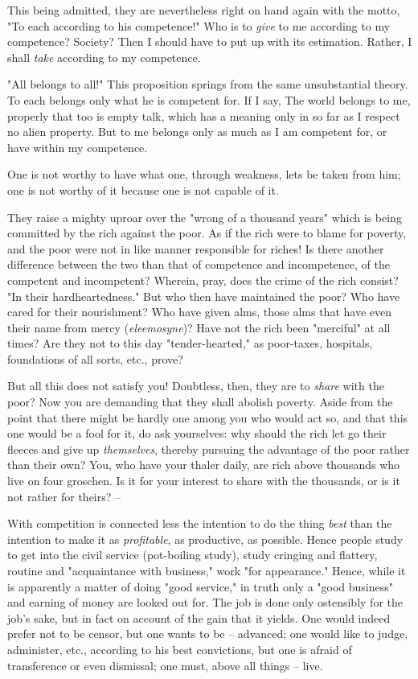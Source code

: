\documentclass[a4paper]{book}
\begin{document}
This being admitted, they are nevertheless right on hand again with the motto, 
"{}To each according to his competence!"{} Who is to \textit{give} to me 
according to my competence? Society? Then I should have to put up with its 
estimation. Rather, I shall \textit{take} according to my competence.

"{}All belongs to all!"{} This proposition springs from the same unsubstantial 
theory. To each belongs only what he is competent for. If I say, The world 
belongs to me, properly that too is empty talk, which has a meaning only in so 
far as I respect no alien property. But to me belongs only as much as I am 
competent for, or have within my competence.

One is not worthy to have what one, through weakness, lets be taken from him; 
one is not worthy of it because one is not capable of it.

They raise a mighty uproar over the "{}wrong of a thousand years"{} which is 
being committed by the rich against the poor. As if the rich were to blame for 
poverty, and the poor were not in like manner responsible for riches! Is there 
another difference between the two than that of competence and incompetence, 
of the competent and incompetent? Wherein, pray, does the crime of the rich 
consist? "{}In their hardheartedness."{} But who then have maintained the 
poor? Who have cared for their nourishment? Who have given alms, those alms 
that have even their name from mercy (\textit{eleemosyne})? Have not the rich 
been "{}merciful"{} at all times? Are they not to this day 
"{}tender-hearted,"{} as poor-taxes, hospitals, foundations of all sorts, 
etc., prove?

But all this does not satisfy you! Doubtless, then, they are to \textit{share} 
with the poor? Now you are demanding that they shall abolish poverty. Aside 
from the point that there might be hardly one among you who would act so, and 
that this one would be a fool for it, do ask yourselves: why should the rich 
let go their fleeces and give up \textit{themselves}, thereby pursuing the 
advantage of the poor rather than their own? You, who have your thaler daily, 
are rich above thousands who live on four groschen. Is it for your interest to 
share with the thousands, or is it not rather for theirs? --

With competition is connected less the intention to do the thing \textit{best} 
than the intention to make it as \textit{profitable}, as productive, as 
possible. Hence people study to get into the civil service (pot-boiling 
study), study cringing and flattery, routine and "{}acquaintance with 
business,"{} work "{}for appearance."{} Hence, while it is apparently a matter 
of doing "{}good service,"{} in truth only a "{}good business"{} and earning 
of money are looked out for. The job is done only ostensibly for the job's 
sake, but in fact on account of the gain that it yields. One would indeed 
prefer not to be censor, but one wants to be -- advanced; one would like to 
judge, administer, etc., according to his best convictions, but one is afraid 
of transference or even dismissal; one must, above all things -- live.
\end{document}
